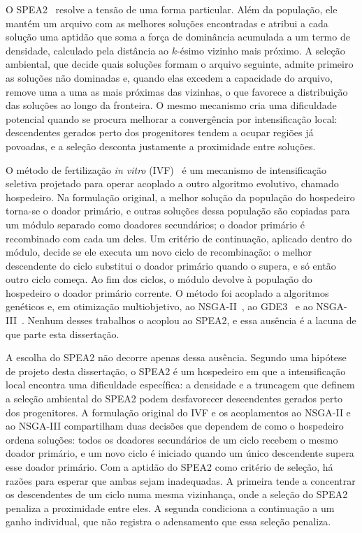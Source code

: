 O SPEA2~\cite{zitzler2001spea2} resolve a tensão de uma forma particular. Além da população, ele mantém um arquivo com as melhores soluções encontradas e atribui a cada solução uma aptidão que soma a força de dominância acumulada a um termo de densidade, calculado pela distância ao $k$-ésimo vizinho mais próximo. A seleção ambiental, que decide quais soluções formam o arquivo seguinte, admite primeiro as soluções não dominadas e, quando elas excedem a capacidade do arquivo, remove uma a uma as mais próximas das vizinhas, o que favorece a distribuição das soluções ao longo da fronteira. O mesmo mecanismo cria uma dificuldade potencial quando se procura melhorar a convergência por intensificação local: descendentes gerados perto dos progenitores tendem a ocupar regiões já povoadas, e a seleção desconta justamente a proximidade entre soluções.

O método de fertilização \textit{in vitro} (IVF)~\cite{camilo-junior2011} é um mecanismo de intensificação seletiva projetado para operar acoplado a outro algoritmo evolutivo, chamado hospedeiro. Na formulação original, a melhor solução da população do hospedeiro torna-se o doador primário, e outras soluções dessa população são copiadas para um módulo separado como doadores secundários; o doador primário é recombinado com cada um deles. Um critério de continuação, aplicado dentro do módulo, decide se ele executa um novo ciclo de recombinação: o melhor descendente do ciclo substitui o doador primário quando o supera, e só então outro ciclo começa. Ao fim dos ciclos, o módulo devolve à população do hospedeiro o doador primário corrente. O método foi acoplado a algoritmos genéticos e, em otimização multiobjetivo, ao NSGA-II~\cite{sampaio2017ivf}, ao GDE3~\cite{sampaio2019ivf} e ao NSGA-III~\cite{Sampaio2024}. Nenhum desses trabalhos o acoplou ao SPEA2, e essa ausência é a lacuna de que parte esta dissertação.

A escolha do SPEA2 não decorre apenas dessa ausência. Segundo uma hipótese de projeto desta dissertação, o SPEA2 é um hospedeiro em que a intensificação local encontra uma dificuldade específica: a densidade e a truncagem que definem a seleção ambiental do SPEA2 podem desfavorecer descendentes gerados perto dos progenitores. A formulação original do IVF e os acoplamentos ao NSGA-II e ao NSGA-III compartilham duas decisões que dependem de como o hospedeiro ordena soluções: todos os doadores secundários de um ciclo recebem o mesmo doador primário, e um novo ciclo é iniciado quando um único descendente supera esse doador primário. Com a aptidão do SPEA2 como critério de seleção, há razões para esperar que ambas sejam inadequadas. A primeira tende a concentrar os descendentes de um ciclo numa mesma vizinhança, onde a seleção do SPEA2 penaliza a proximidade entre eles. A segunda condiciona a continuação a um ganho individual, que não registra o adensamento que essa seleção penaliza.

